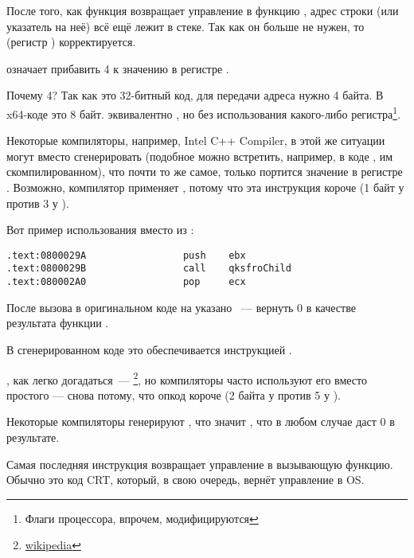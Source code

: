 После того, как функция \printf возвращает управление в функцию \main, адрес строки (или указатель на неё) всё ещё лежит в стеке.
Так как он больше не нужен, то  (регистр \ESP) корректируется.

 означает прибавить 4 к значению в регистре \ESP.

Почему 4? Так как это 32-битный код, для передачи адреса нужно 4 байта. В x64-коде это 8 байт.
 эквивалентно , но без использования какого-либо регистра\footnote{Флаги процессора, впрочем, модифицируются}.

\index{\oracle}

Некоторые компиляторы, например, Intel C++ Compiler, в этой же ситуации могут вместо 
\ADD сгенерировать  (подобное можно встретить, например, в коде \oracle{}, им скомпилированном),
что почти то же самое, только портится значение в регистре \ECX.
Возможно, компилятор применяет , потому что эта инструкция короче (1 байт у  против 3 у ).

Вот пример использования \POP вместо \ADD из \oracle{}:

\begin{lstlisting}[caption=\oracle 10.2 Linux (файл app.o)]
.text:0800029A                 push    ebx
.text:0800029B                 call    qksfroChild
.text:080002A0                 pop     ecx
\end{lstlisting}

После вызова \printf в оригинальном коде на \CCpp указано ~--- вернуть 0 в качестве результата функции \main.

В сгенерированном коде это обеспечивается инструкцией .


\XOR, как легко догадаться~--- \footnote{\href{http://go.yurichev.com/17118}{wikipedia}}, но компиляторы часто используют его вместо простого
 --- снова потому, что опкод короче (2 байта у \XOR против 5 у \MOV).

Некоторые компиляторы генерируют , что значит  \EAX {}\EAX, что в любом случае даст 0 в результате.

Самая последняя инструкция \RET возвращает управление в вызывающую функцию. Обычно это код \CCpp \ac{CRT}, который, в свою очередь, вернёт управление в \ac{OS}.

